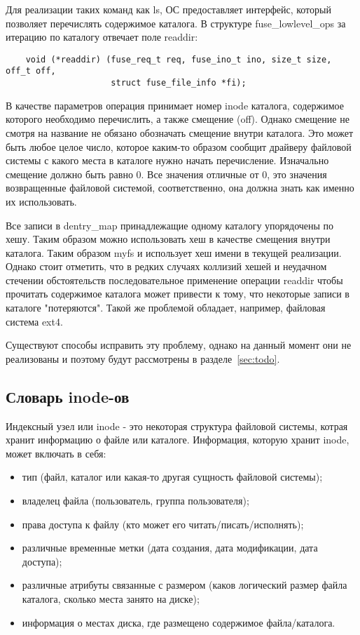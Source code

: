 Для реализации таких команд как ls, ОС предоставляет интерфейс, который
позволяет перечислять содержимое каталога. В структуре fuse\_lowlevel\_ops
за итерацию по каталогу отвечает поле readdir:
\begin{lstlisting}
    void (*readdir) (fuse_req_t req, fuse_ino_t ino, size_t size, off_t off,
                     struct fuse_file_info *fi);
\end{lstlisting}

В качестве параметров операция принимает номер inode каталога, содержимое
которого необходимо перечислить, а также смещение (off). Однако смещение не смотря на
название не обязано обозначать смещение внутри каталога. Это может быть любое
целое число, которое каким-то образом сообщит драйверу файловой системы с какого
места в каталоге нужно начать перечисление. Изначально смещение должно быть
равно 0. Все значения отличные от 0, это значения возвращенные файловой
системой, соответственно, она должна знать как именно их использовать.

Все записи в dentry\_map принадлежащие одному каталогу упорядочены по хешу.
Таким образом можно использовать хеш в качестве смещения внутри каталога. Таким
образом myfs и использует хеш имени в текущей реализации. Однако стоит отметить,
что в редких случаях коллизий хешей и неудачном стечении обстоятельств
последовательное применение операции readdir чтобы прочитать содержимое каталога
может привести к тому, что некоторые записи в каталоге "потеряются". Такой же
проблемой обладает, например, файловая система ext4.

Существуют способы исправить эту проблему, однако на данный момент они не
реализованы и поэтому будут рассмотрены в разделе~\ref{sec:todo}.


\subsection{Словарь inode-ов}

Индексный узел или inode - это некоторая структура файловой системы, котрая
хранит информацию о файле или каталоге. Информация, которую хранит inode, может
включать в себя:
\begin{itemize}
  \item тип (файл, каталог или какая-то другая сущность файловой системы);
  \item владелец файла (пользователь, группа пользователя);
  \item права доступа к файлу (кто может его читать/писать/исполнять);
  \item различные временные метки (дата создания, дата модификации, дата
        доступа);
  \item различные атрибуты связанные с размером (каков логический размер файла
        каталога, сколько места занято на диске);
  \item информация о местах диска, где размещено содержимое файла/каталога.
\end{itemize}


